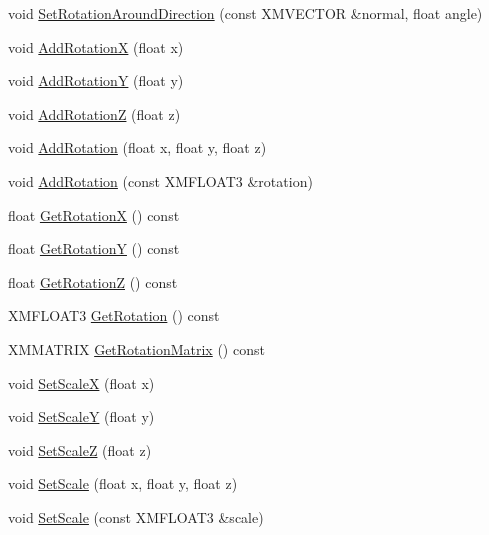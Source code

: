 \begin{DoxyCompactItemize}
\item 
void \hyperlink{structmage_1_1_transform_afad1810a6efc642aeb3c54488501c704}{Set\+Rotation\+Around\+Direction} (const X\+M\+V\+E\+C\+T\+OR \&normal, float angle)
\item 
void \hyperlink{structmage_1_1_transform_ae2a3a4a33ec637b9c39e97519bab5a11}{Add\+RotationX} (float x)
\item 
void \hyperlink{structmage_1_1_transform_afc958d2361a5606962b51646825287e2}{Add\+RotationY} (float y)
\item 
void \hyperlink{structmage_1_1_transform_ae70e192a7d98366b629c3d75a7d2d3bd}{Add\+RotationZ} (float z)
\item 
void \hyperlink{structmage_1_1_transform_a71126843acf10e00d0381b5463978aba}{Add\+Rotation} (float x, float y, float z)
\item 
void \hyperlink{structmage_1_1_transform_a10825624e694790a60e0ea507207132e}{Add\+Rotation} (const X\+M\+F\+L\+O\+A\+T3 \&rotation)
\item 
float \hyperlink{structmage_1_1_transform_aaaf300a4a24b976c271ba17c8a41beaf}{Get\+RotationX} () const
\item 
float \hyperlink{structmage_1_1_transform_a93ccd53bd0a4e71ab7f42447d482ab86}{Get\+RotationY} () const
\item 
float \hyperlink{structmage_1_1_transform_ae1dd099e12e6dedadbc31d679343b39a}{Get\+RotationZ} () const
\item 
X\+M\+F\+L\+O\+A\+T3 \hyperlink{structmage_1_1_transform_a30a0464b1bd2fb37d6b5cc2155323a14}{Get\+Rotation} () const
\item 
X\+M\+M\+A\+T\+R\+IX \hyperlink{structmage_1_1_transform_a27ca7a5c40ea16c9a885a410b2a1f416}{Get\+Rotation\+Matrix} () const
\item 
void \hyperlink{structmage_1_1_transform_a4d1fbb0b609e40b6b13e0e282259d223}{Set\+ScaleX} (float x)
\item 
void \hyperlink{structmage_1_1_transform_a77251bb29fbd26817c0b8c8aabb96ce4}{Set\+ScaleY} (float y)
\item 
void \hyperlink{structmage_1_1_transform_af8cd0167f776708697041544886ff2de}{Set\+ScaleZ} (float z)
\item 
void \hyperlink{structmage_1_1_transform_a6c7e193f6bfddb8c7af5c35b538cdee5}{Set\+Scale} (float x, float y, float z)
\item 
void \hyperlink{structmage_1_1_transform_a72e4788366a1638a80fd124e344d0d33}{Set\+Scale} (const X\+M\+F\+L\+O\+A\+T3 \&scale)
\item 

\end{DoxyCompactItemize}
